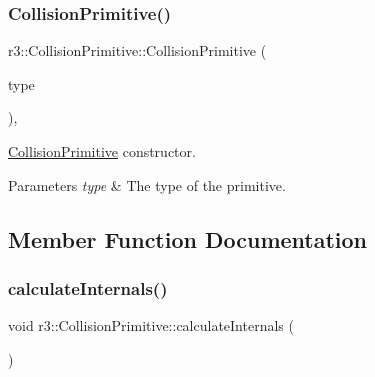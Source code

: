 \mbox{\label{classr3_1_1_collision_primitive_a56f4cef84fcb4d92b0ced2ffcefdb22a}} 
\subsubsection{\texorpdfstring{Collision\+Primitive()}{CollisionPrimitive()}}
{\footnotesize\ttfamily r3\+::\+Collision\+Primitive\+::\+Collision\+Primitive (\begin{DoxyParamCaption}\item[{Collision\+Primitive\+Type}]{type }\end{DoxyParamCaption})\hspace{0.3cm}{\ttfamily [explicit]}, {\ttfamily [protected]}}



\mbox{\hyperlink{classr3_1_1_collision_primitive}{Collision\+Primitive}} constructor. 


\begin{DoxyParams}{Parameters}
{\em type} & The type of the primitive. \\
\hline
\end{DoxyParams}


\subsection{Member Function Documentation}
\mbox{\label{classr3_1_1_collision_primitive_ae27cb70a6812491c2d8de97f22c07ac6}} 
\subsubsection{\texorpdfstring{calculate\+Internals()}{calculateInternals()}}
{\footnotesize\ttfamily void r3\+::\+Collision\+Primitive\+::calculate\+Internals (\begin{DoxyParamCaption}{ }\end{DoxyParamCaption})}




